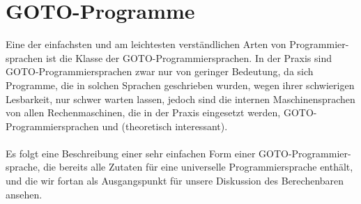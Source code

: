 \documentclass[11pt,a4paper,leqno]{report}
\numberwithin{equation}{chapter}
\begin{document}
\section{GOTO-Programme}
Eine der einfachsten und am leichtesten verst\"andlichen Arten von Programmier- sprachen ist die Klasse der GOTO-Programmiersprachen. In der Praxis sind GOTO-Programmiersprachen zwar nur von geringer Bedeutung, da sich Programme, die in solchen Sprachen geschrieben wurden, wegen ihrer schwierigen Lesbarkeit, nur schwer warten lassen, jedoch sind die internen Maschinensprachen von allen Rechenmaschinen, die in der Praxis eingesetzt werden, GOTO-Programmiersprachen und (theoretisch interessant).\\
\\
Es folgt eine Beschreibung einer sehr einfachen Form einer GOTO-Programmier- sprache, die bereits alle Zutaten f\"ur eine universelle Programmiersprache enth\"alt, und die wir fortan als Ausgangspunkt f\"ur unsere Diskussion des Berechenbaren ansehen.
\end{document}
